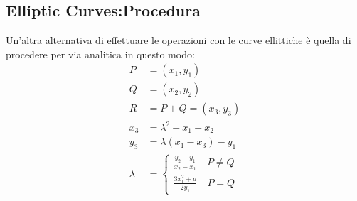 \documentclass{book}
\begin{document}
\subsection{Elliptic Curves:Procedura}
Un'altra alternativa di effettuare le operazioni con le curve ellittiche è quella di procedere per via analitica in questo modo:\begin{align*}
	P&=(x_{1},y_{1})\\
	Q&=(x_{2},y_{2})\\
	R&=P+Q=(x_{3},y_{3})\\
	x_{3}&=\lambda^{2}-x_{1}-x_{2}\\
	y_{3}&=\lambda(x_{1}-x_{3})-y_{1}\\
	\lambda&=\begin{cases}
		\frac{y_{2}-y_{1}}{x_{2}-x_{1}} \quad P\neq Q\\
		\frac{3x_{1}^{2}+a}{2y_{1}} \quad P=Q
	\end{cases}
\end{align*}
\newpage
\end{document}

